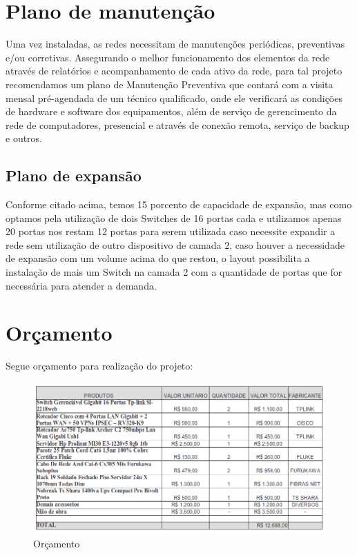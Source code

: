 \documentclass[	DIV=calc,%
							paper=a4,%
							fontsize=12pt,%
							onecolumn]{scrartcl}	 					%
\begin{document}
\section{Plano de manutenção}

Uma vez instaladas, as redes necessitam de manutenções periódicas, preventivas e/ou corretivas. Assegurando o melhor funcionamento dos elementos da rede através de relatórios e acompanhamento de cada ativo da rede, para tal projeto recomendamos um plano de Manutenção Preventiva que contará com a visita mensal pré-agendada de um técnico qualificado, onde ele verificará as condições de hardware e software dos equipamentos, além de serviço de gerencimento da rede de computadores, presencial e através de conexão remota, serviço de backup e outros.

\subsection{Plano de expansão}
Conforme citado acima, temos 15 porcento de capacidade de expansão, mas como optamos pela utilização de dois Switches de 16 portas cada e utilizamos apenas 20 portas nos restam 12 portas para serem utilizada caso necessite expandir a rede sem utilização de outro dispositivo de camada 2, caso houver a necessidade de expansão com um volume acima do que restou, o layout possibilita a instalação de mais um Switch na camada 2 com a quantidade de portas que for necessária para atender a demanda. 



\section{Orçamento}
Segue orçamento para realização do projeto:
\begin{figure}[H]
	\centering
	\includegraphics[width=\textwidth]{fig12}
	\caption{Orçamento}
	\label{fig12}
\end{figure}
\end{document}
